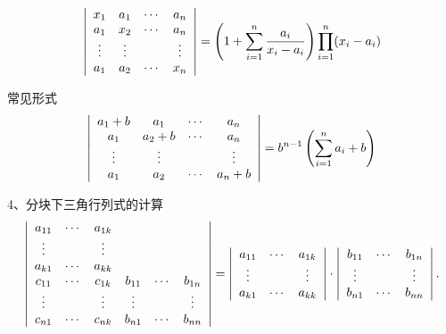 \begin{frame}
  \begin{li}
    $$
    \left|
      \begin{array}{cccc}
        x_1 & a_1  & \cdots & a_n   \\
        a_1 & x_2 & \cdots  & a_n   \\
        \vdots & \vdots &     & \vdots \\
        a_1 & a_2  & \cdots & x_n
      \end{array}
    \right|=  \left(1+\sum_{i=1}^n \frac{a_i}{x_i-a_i}\right)\prod_{i=1}^n(x_i-a_i)
    $$      
  \end{li}
  常见形式
  $$
  \left|
    \begin{array}{cccc}
      a_1+b & a_1   & \cdots & a_n   \\
      a_1   & a_2+b & \cdots  & a_n   \\
      \vdots   & \vdots  &     & \vdots \\
      a_1   & a_2   & \cdots & a_n+b
    \end{array}
  \right|  = b^{n-1}\left(\sum_{i=1}^na_i+b\right)
  $$ 
\end{frame}

\begin{frame}
  4、分块下三角行列式的计算
  $$
  \begin{aligned}
    \left|
      \begin{array}{cccccc}
        a_{11} & \cdots & a_{1k} &    &    &   \\
        \vdots    &     &  \vdots  &    &    &   \\
        a_{k1} & \cdots & a_{kk} &    &    &   \\
        c_{11} & \cdots & c_{1k} & b_{11}&  \cdots & b_{1n}   \\
        \vdots    &     & \vdots   & \vdots  &    & \vdots \\
        c_{n1} & \cdots & c_{nk} & b_{n1}&  \cdots & b_{nn}
      \end{array}
    \right| = \left|
      \begin{array}{ccc}
        a_{11} & \cdots & a_{1k} \\
        \vdots    &     &  \vdots  \\
        a_{k1} & \cdots & a_{kk} \\
      \end{array}
    \right|\cdot \left|
      \begin{array}{ccc}
        b_{11} & \cdots & b_{1n} \\
        \vdots    &     &  \vdots  \\
        b_{n1} & \cdots & b_{nn} \\
      \end{array}
    \right|.
  \end{aligned}
  $$
\end{frame}

